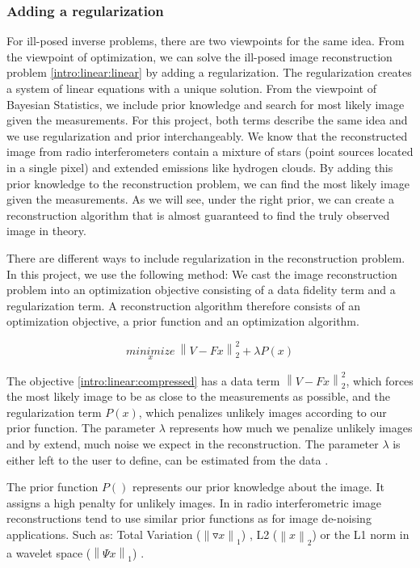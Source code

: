 \subsubsection{Adding a regularization} \label{intro:linear:regularization}
For ill-posed inverse problems, there are two viewpoints for the same idea. From the viewpoint of optimization, we can solve the ill-posed image reconstruction problem \eqref{intro:linear:linear} by adding a regularization. The regularization creates a system of linear equations with a unique solution. From the viewpoint of Bayesian Statistics, we include prior knowledge and search for most likely image given the measurements. For this project, both terms describe the same idea and we use regularization and prior interchangeably. We know that the reconstructed image from radio interferometers contain a mixture of stars (point sources located in a single pixel) and extended emissions like hydrogen clouds. By adding this prior knowledge to the reconstruction problem, we can find the most likely image given the measurements. As we will see, under the right prior, we can create a reconstruction algorithm that is almost guaranteed to find the truly observed image in theory.

There are different ways to include regularization in the reconstruction problem. In this project, we use the following method: We cast the image reconstruction problem into an optimization objective consisting of a data fidelity term and a regularization term. A reconstruction algorithm therefore consists of an optimization objective, a prior function and an optimization algorithm.

\begin{equation}\label{intro:linear:compressed}
\underset{x}{minimize} \: \left \| V - Fx \right \|_2^2 + \lambda P(x)
\end{equation}

The objective \eqref{intro:linear:compressed} has a data term $\left \| V - Fx \right \|_2^2$, which forces the most likely image to be as close to the measurements as possible, and the regularization term $P(x)$, which penalizes unlikely images according to our prior function. The parameter $\lambda$ represents how much we penalize unlikely images and by extend, much noise we expect in the reconstruction. The parameter $\lambda$ is either left to the user to define, can be estimated from the data \cite{miller1970least}. 

The prior function $P()$ represents our prior knowledge about the image. It assigns a high penalty for unlikely images. In in radio interferometric image reconstructions tend to use similar prior functions as for image de-noising applications. Such as: Total Variation ($\left \| \triangledown x \right \|_1$) \cite{wiaux2009compressed}, L2 ($\left \|x \right \|_2$) \cite{ferrari2014distributed} or the L1 norm in a wavelet space ($\left \|\Psi x \right \|_1$) \cite{girard2015sparse}.

